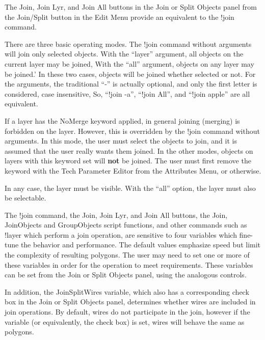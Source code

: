 The {\cb Join}, {\cb Join Lyr}, and {\cb Join All} buttons in the {\cb
Join or Split Objects} panel from the {\cb Join/Split} button in the
{\cb Edit Menu} provide an equivalent to the {\cb !join} command.

There are three basic operating modes.  The {\cb !join} command
without arguments will join only selected objects.  With the ``layer''
argument, all objects on the current layer may be joined, With the
``all'' argument, objects on any layer may be joined.' In these two
cases, objects will be joined whether selected or not.  For the
arguments, the traditional ``{\vt -}'' is actually optional, and only
the first letter is considered, case insensitive, So, ``{\vt !join
-a}'', ``{\vt !join All}'', and ``{\vt !join apple}'' are all
equivalent.

If a layer has the {\vt NoMerge} keyword applied, in general joining
(merging) is forbidden on the layer.  However, this is overridden by
the {\cb !join} command without arguments.  In this mode, the user
must select the objects to join, and it is assumed that the user
really wants them joined.  In the other modes, objects on layers with
this keyword set will {\bf not} be joined.  The user must first remove
the keyword with the {\cb Tech Parameter Editor} from the {\cb
Attributes Menu}, or otherwise.

In any case, the layer must be visible.  With the ``all'' option, the
layer must also be selectable.

The {\cb !join} command, the {\cb Join}, {\cb Join Lyr}, and {\cb Join
All} buttons, the {\vt Join}, {\vt JoinObjects} and {\vt GroupObjects}
script functions, and other commands such as {\cb !layer} which
perform a join operation, are sensitive to four variables which
fine-tune the behavior and performance.  The default values emphasize
speed but limit the complexity of resulting polygons.  The user may
need to set one or more of these variables in order for the operation
to meet requirements.  These variables can be set from the {\cb Join
or Split Objects} panel, using the analogous controls.

In addition, the {\cb JoinSplitWires} variable, which also has a
corresponding check box in the {\cb Join or Split Objects} panel,
determines whether wires are included in join operations.  By default,
wires do not participate in the join, however if the variable (or
equivalently, the check box) is set, wires will behave the same as
polygons.

